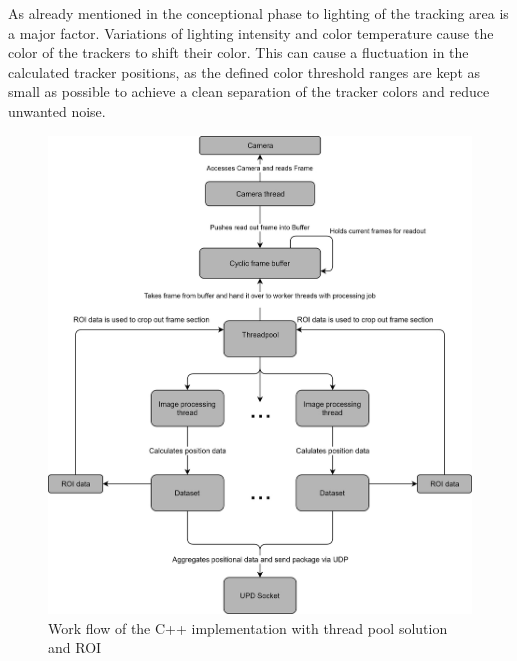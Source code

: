 As already mentioned in the conceptional phase to lighting of the tracking area is a major factor. Variations of lighting intensity and color temperature cause the color of the trackers to shift their color. This can cause a fluctuation in the calculated tracker positions, as the defined color threshold ranges are kept as small as possible to achieve a clean separation of the tracker colors and reduce unwanted noise. 
\begin{figure}[H]
\includegraphics[width=\textwidth]{images/pi_workflow_500.jpg}
\caption{Work flow of the C++ implementation with thread pool solution and ROI}
\label{c++ work flow map} 
\end{figure}
